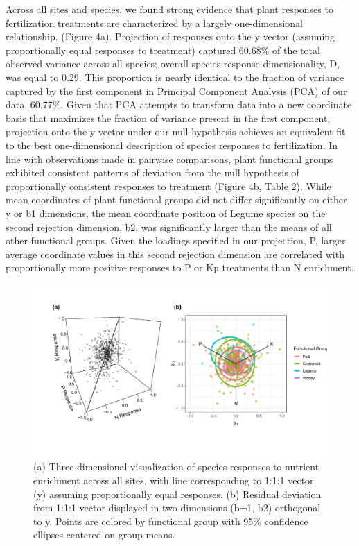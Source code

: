 \documentclass[twoside,12pt,final]{ucthesis-CA2012}
\begin{document}
\begin{ucmainmatter}
Across all sites and species, we found strong evidence that plant responses to fertilization treatments are characterized by a largely one-dimensional relationship. (Figure 4a). Projection of responses onto the y vector (assuming proportionally equal responses to treatment) captured 60.68\% of the total observed variance across all species; overall species response dimensionality, D, was equal to 0.29. This proportion is nearly identical to the fraction of variance captured by the first component in Principal Component Analysis (PCA) of our data, 60.77\%. Given that PCA attempts to transform data into a new coordinate basis that maximizes the fraction of variance present in the first component, projection onto the y vector under our null hypothesis achieves an equivalent fit to the best one-dimensional description of species responses to fertilization.
In line with observations made in pairwise comparisons, plant functional groups exhibited consistent patterns of deviation from the null hypothesis of proportionally consistent responses to treatment (Figure 4b, Table 2). While mean coordinates of plant functional groups did not differ significantly on either y or b1 dimensions, the mean coordinate position of Legume species on the second rejection dimension, b2, was significantly larger than the means of all other functional groups. Given the loadings specified in our projection, P, larger average coordinate values in this second rejection dimension are correlated with proportionally more positive responses to P or Kµ treatments than N enrichment.
\begin{figure}
\centering
\includegraphics[width=\textwidth,height=0.45\textheight]{figure/Fig1_4.png}
\caption{\newline (a) Three-dimensional visualization of species responses to nutrient enrichment across all sites, with line corresponding to 1:1:1 vector (y) assuming proportionally equal responses. \newline (b) Residual deviation from 1:1:1 vector displayed in two dimensions (b¬1, b2) orthogonal to y. Points are colored by functional group with 95\% confidence ellipses centered on group means. \label{fig-1-4}}

\end{figure}
\end{ucmainmatter}
\end{document}

